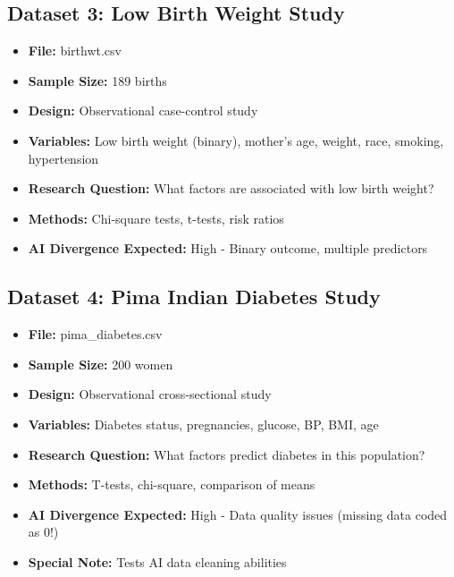 \documentclass[11pt]{article}
\begin{document}
\subsection{Dataset 3: Low Birth Weight Study}
\begin{itemize}
\item \textbf{File:} birthwt.csv
\item \textbf{Sample Size:} 189 births
\item \textbf{Design:} Observational case-control study
\item \textbf{Variables:} Low birth weight (binary), mother's age, weight, race, smoking, hypertension
\item \textbf{Research Question:} What factors are associated with low birth weight?
\item \textbf{Methods:} Chi-square tests, t-tests, risk ratios
\item \textbf{AI Divergence Expected:} High - Binary outcome, multiple predictors
\end{itemize}

\subsection{Dataset 4: Pima Indian Diabetes Study}
\begin{itemize}
\item \textbf{File:} pima\_diabetes.csv
\item \textbf{Sample Size:} 200 women
\item \textbf{Design:} Observational cross-sectional study
\item \textbf{Variables:} Diabetes status, pregnancies, glucose, BP, BMI, age
\item \textbf{Research Question:} What factors predict diabetes in this population?
\item \textbf{Methods:} T-tests, chi-square, comparison of means
\item \textbf{AI Divergence Expected:} High - Data quality issues (missing data coded as 0!)
\item \textbf{Special Note:} Tests AI data cleaning abilities
\end{itemize}
\end{document}
